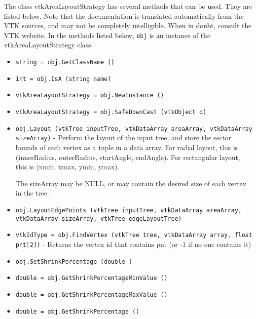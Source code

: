 The class vtkAreaLayoutStrategy has several methods that can be used.
  They are listed below.
Note that the documentation is translated automatically from the VTK sources,
and may not be completely intelligible.  When in doubt, consult the VTK website.
In the methods listed below, \verb|obj| is an instance of the vtkAreaLayoutStrategy class.
\begin{itemize}
\item  \verb|string = obj.GetClassName ()|

\item  \verb|int = obj.IsA (string name)|

\item  \verb|vtkAreaLayoutStrategy = obj.NewInstance ()|

\item  \verb|vtkAreaLayoutStrategy = obj.SafeDownCast (vtkObject o)|

\item  \verb|obj.Layout (vtkTree inputTree, vtkDataArray areaArray, vtkDataArray sizeArray)| -  Perform the layout of the input tree, and store the sector
 bounds of each vertex as a tuple in a data array.
 For radial layout, this is
 (innerRadius, outerRadius, startAngle, endAngle).
 For rectangular layout, this is
 (xmin, xmax, ymin, ymax).

 The sizeArray may be NULL, or may contain the desired
 size of each vertex in the tree.

\item  \verb|obj.LayoutEdgePoints (vtkTree inputTree, vtkDataArray areaArray, vtkDataArray sizeArray, vtkTree edgeLayoutTree)|

\item  \verb|vtkIdType = obj.FindVertex (vtkTree tree, vtkDataArray array, float pnt[2])| -  Returns the vertex id that contains pnt (or -1 if no one contains it)

\item  \verb|obj.SetShrinkPercentage (double )|

\item  \verb|double = obj.GetShrinkPercentageMinValue ()|

\item  \verb|double = obj.GetShrinkPercentageMaxValue ()|

\item  \verb|double = obj.GetShrinkPercentage ()|

\end{itemize}
